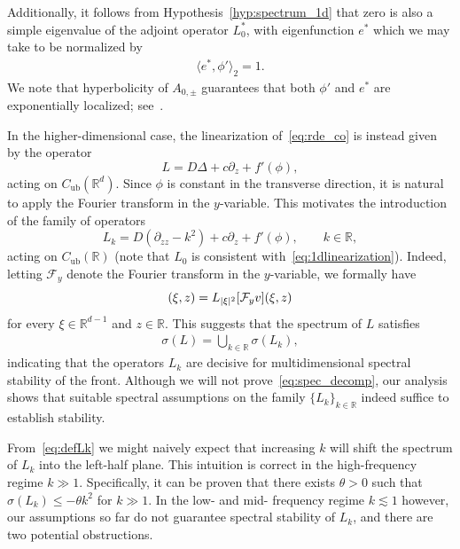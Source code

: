 \documentclass[12pt,oneside,a4paper,reqno]{amsart}
\numberwithin{equation}{section}
\theoremstyle{definition}
\theoremstyle{remark}
\newcommand{\cF}{{\mathcal F}}
\newcommand{\bbR}{{\mathbb R}}
\newcommand{\Cub}{{C_{\mathrm{ub}}}}
\DeclarePairedDelimiter{\abs}{\lvert}{\rvert}
\begin{document}
Additionally, it follows from Hypothesis~\ref{hyp:spectrum_1d} that zero is also a simple eigenvalue of the adjoint operator $L_0^*$, with eigenfunction $e^*$ which we may take to be normalized by
\begin{align} \label{eq:normalization}
    \langle e^*,\phi'\rangle_2 = 1.
\end{align}
We note that hyperbolicity of $A_{0,\pm}$ guarantees that both $\phi'$ and $e^*$ are exponentially localized; see~\cite[Theorem~3.2]{Sandstede_stability_2002}.

In the higher-dimensional case, the linearization of~\eqref{eq:rde_co} is instead given by the operator
\begin{equation*}
    L = D \Delta + c \partial_z + f'(\phi),
\end{equation*}
acting on $\Cub(\bbR^d)$.
Since $\phi$ is constant in the transverse direction, it is natural to apply the Fourier transform in the $y$-variable.
This motivates the introduction of the family of operators
\begin{equation} \label{eq:defLk}
    L_k = D (\partial_{zz} - k^2) + c \partial_z + f'(\phi), \qquad k \in \bbR,
\end{equation}
acting on $\Cub(\bbR)$ (note that $L_0$ is consistent with~\eqref{eq:1dlinearization}).
Indeed, letting $\cF_y$ denote the Fourier transform in the $y$-variable, we formally have
\begin{equation*}
    [\cF_y L v](\xi,z) = L_{\abs{\xi}^2} [\cF_y v](\xi,z)
\end{equation*}
for every $\xi \in \bbR^{d-1}$ and $z \in \bbR$.
This suggests that the spectrum of $L$ satisfies
\begin{align} \label{eq:spec_decomp}
\sigma(L) = \bigcup_{k \in \bbR} \sigma(L_k),
\end{align}
indicating that the operators $L_k$ are decisive for multidimensional spectral stability of the front. Although we will not prove~\eqref{eq:spec_decomp}, our analysis shows that suitable spectral assumptions on the family $\{L_k\}_{k \in \bbR}$ indeed suffice to establish stability.

From~\eqref{eq:defLk} we might naively expect that increasing $k$ will shift the spectrum of $L_k$ into the left-half plane. This intuition is correct in the high-frequency regime $k \gg 1$. Specifically, it can be proven that there exists $\theta > 0$ such that $\sigma(L_k) \leq -\theta k^2$ for $k \gg 1$.
In the low- and mid- frequency regime $k \lesssim 1$ however, our assumptions so far do not guarantee spectral stability of $L_k$, and there are two potential obstructions.
\end{document}
